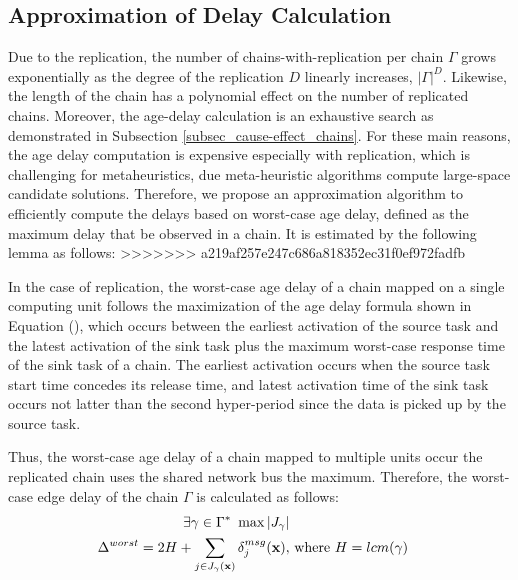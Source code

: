 \subsection{Approximation of Delay Calculation}\label{subsec_approximation_alg}
Due to the replication, the number of chains-with-replication per chain $\Gamma$ grows exponentially as the degree of the replication $D$ linearly increases, $|\Gamma|^D$. Likewise, the length of the chain has a polynomial effect on the number of replicated chains. Moreover, the age-delay calculation is an exhaustive search as demonstrated in Subsection \ref{subsec_cause-effect_chains}. For these main reasons, the age delay computation is expensive especially with replication, which is challenging for metaheuristics, due meta-heuristic algorithms compute large-space candidate solutions. Therefore, we propose an approximation algorithm to efficiently compute the delays based on worst-case age delay, defined as the maximum delay that be observed in a chain. It is estimated by the following lemma as follows:
>>>>>>> a219af257e247c686a818352ec31f0ef972fadfb
\begin{lemma} 
	In the case of replication, the worst-case age delay of a chain mapped on a single computing unit follows the maximization of the age delay formula shown in Equation (), which occurs between the earliest activation of the source task and the latest activation of the sink task plus the maximum worst-case response time of the sink task of a chain. The earliest activation occurs when the source task start time concedes its release time, and latest activation time of the sink task occurs not latter than the second hyper-period since the data is picked up by the source task. 
	
	
	Thus, the worst-case age delay of a chain mapped to multiple units occur the replicated chain uses the shared network bus the maximum. Therefore, the worst-case edge delay of the chain $\Gamma$ is calculated as follows:
	\begin{align}
		\exists \gamma\in\Gamma^*\ \max{|J_\gamma|}\\
		\Delta^{worst}=2H+\sum_{j\in J_{\gamma}(\textbf{x})}{\delta^{msg}_j(\textbf{x})}, & \mbox{ where } H=lcm(\gamma)
	\end{align}
\end{lemma}




